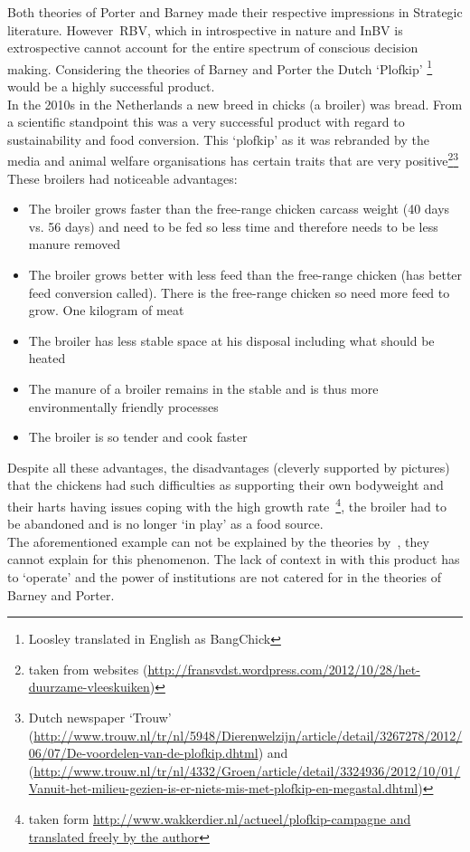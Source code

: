 



Both theories of Porter and Barney made their respective impressions in Strategic literature.  However~\gls{RBV}, which in introspective in nature and \gls{InBV} is extrospective cannot account for the entire spectrum of conscious decision making.
Considering the theories of Barney and Porter the Dutch `Plofkip' \footnote{Loosley translated in English as BangChick} would be a highly successful product.\\
In the 2010s in the Netherlands a new breed in chicks (a broiler) was bread. From a scientific standpoint this was a very successful product with regard to sustainability and food conversion. 
This `plofkip' as it was rebranded by the media and animal welfare organisations has certain traits that are very positive\footnote{taken from websites (\url{http://fransvdst.wordpress.com/2012/10/28/het-duurzame-vleeskuiken})}\footnote{Dutch newspaper `Trouw'
(\url{http://www.trouw.nl/tr/nl/5948/Dierenwelzijn/article/detail/3267278/2012/06/07/De-voordelen-van-de-plofkip.dhtml}) 
and (\url{http://www.trouw.nl/tr/nl/4332/Groen/article/detail/3324936/2012/10/01/Vanuit-het-milieu-gezien-is-er-niets-mis-met-plofkip-en-megastal.dhtml})}
These broilers had noticeable advantages:

\begin{itemize}
 \setlength{\itemsep}{1pt}
\item The broiler grows faster than the free-range chicken carcass weight (40 days vs. 56 days) and need to be fed so less time and therefore needs to be less manure removed
 \item    The broiler grows better with less feed than the free-range chicken (has better feed conversion called). There is the free-range chicken so need more feed to grow. One kilogram of meat
\item     The broiler has less stable space at his disposal including what should be heated
\item     The manure of a broiler remains in the stable and is thus more environmentally friendly processes
  \item   The broiler is so tender and cook faster
\end{itemize}
Despite all these advantages, the disadvantages (cleverly supported by pictures) that the chickens had such difficulties as supporting their own bodyweight and their harts having issues coping with the high growth rate~\footnote{taken form \url{http://www.wakkerdier.nl/actueel/plofkip-campagne and translated freely by the author}}, the broiler had to be abandoned and is no longer `in play' as a food source.\\
The aforementioned example can not be explained by the theories by~\cite{Porter:1980,Barney:1991}, they cannot explain for this phenomenon. 
The lack of context in with this product has to `operate'  and the power of institutions are not catered for in the theories of Barney and Porter.




